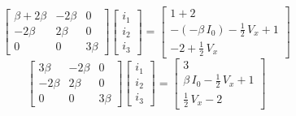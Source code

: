 \documentclass[letter,11pt]{article}
\begin{document}
\begin{enumerate}
\begin{equation*}
    \begin{bmatrix}
        \beta + 2\beta & -2\beta & 0 \\
        -2\beta & 2\beta & 0 \\
        0 & 0 & 3\beta
    \end{bmatrix}
    \begin{bmatrix}
        i_1 \\
        i_2 \\
        i_3
    \end{bmatrix}
    =
    \begin{bmatrix}
        1 + 2 \\
        -(-\beta\,I_0) - \frac{1}{2}\,V_x + 1 \\
        -2 + \frac{1}{2}\,V_x
    \end{bmatrix}
\end{equation*}
\begin{equation*}
    \begin{bmatrix}
        3\beta & -2\beta & 0 \\
        -2\beta & 2\beta & 0 \\
        0 & 0 & 3\beta
    \end{bmatrix}
    \begin{bmatrix}
        i_1 \\
        i_2 \\
        i_3
    \end{bmatrix}
    =
    \begin{bmatrix}
        3 \\
        \beta\,I_0 - \frac{1}{2}\,V_x + 1 \\
        \frac{1}{2}\,V_x - 2
    \end{bmatrix}
\end{equation*}


\end{enumerate}
\end{document}
